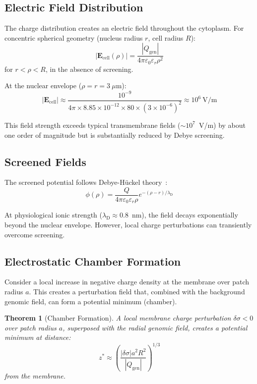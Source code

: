 \documentclass[twocolumn,aps,prb,superscriptaddress,longbibliography,floatfix]{revtex4-2}
\newtheorem{theorem}{Theorem}[section]
\theoremstyle{remark}
\newcommand{\Qgen}{Q_\text{gen}}
\newcommand{\lambdaD}{\lambda_\text{D}}
\newcommand{\Ecell}{\mathbf{E}_\text{cell}}
\begin{document}
\subsection{Electric Field Distribution}

The charge distribution creates an electric field throughout the
cytoplasm. For concentric spherical geometry (nucleus radius $r$,
cell radius $R$):
\begin{equation}
|\Ecell(\rho)| = \frac{|\Qgen|}{4\pi\varepsilon_0\varepsilon_r\rho^2}
\end{equation}
for $r < \rho < R$, in the absence of screening.

At the nuclear envelope ($\rho = r = 3~\mu$m):
\begin{equation}
|\Ecell| \approx \frac{10^{-9}}{4\pi \times 8.85 \times 10^{-12} \times 80 \times (3 \times 10^{-6})^2} \approx 10^6~\text{V/m}
\end{equation}

This field strength exceeds typical transmembrane fields
($\sim 10^7$~V/m) by about one order of magnitude but is substantially
reduced by Debye screening.

\subsection{Screened Fields}

The screened potential follows Debye-H\"{u}ckel theory~\cite{Debye1923}:
\begin{equation}
\phi(\rho) = \frac{Q}{4\pi\varepsilon_0\varepsilon_r\rho} e^{-(\rho-r)/\lambdaD}
\end{equation}

At physiological ionic strength ($\lambdaD \approx 0.8$~nm), the field
decays exponentially beyond the nuclear envelope. However, local charge
perturbations can transiently overcome screening.

\subsection{Electrostatic Chamber Formation}

Consider a local increase in negative charge density at the membrane
over patch radius $a$. This creates a perturbation field that, combined
with the background genomic field, can form a potential minimum
(chamber).

\begin{theorem}[Chamber Formation]
\label{thm:chamber}
A local membrane charge perturbation $\delta\sigma < 0$ over patch
radius $a$, superposed with the radial genomic field, creates a
potential minimum at distance:
\begin{equation}
z^* \approx \left(\frac{|\delta\sigma| a^2 R^2}{|\Qgen|}\right)^{1/3}
\label{eq:chamber_distance}
\end{equation}
from the membrane.
\end{theorem}
\end{document}
